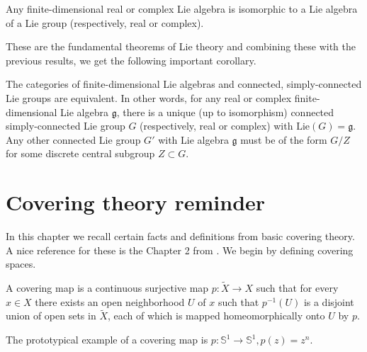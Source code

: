 \documentclass{report}
\begin{document}
\begin{theorem}
Any finite-dimensional real or complex Lie algebra is isomorphic to a Lie algebra of a Lie group (respectively, real or complex).
\end{theorem}

These are the fundamental theorems of Lie theory and combining these with the previous results, we get the following important corollary.

\begin{corollary}
    The categories of finite-dimensional Lie algebras and connected, simply-connected Lie groups are equivalent.
    In other words, for any real or complex finite-dimensional Lie algebra $\mathfrak{g}$, there is a unique (up to isomorphism) connected simply-connected Lie group $G$ (respectively, real or complex) with $\text{Lie}(G) = \mathfrak{g}$. Any other connected Lie group $G'$ with Lie algebra $\mathfrak{g}$ must be of the form $G/Z$ for some discrete central subgroup $Z \subset G$.
\end{corollary}


\appendix

\chapter{Covering theory reminder}
In this chapter we recall certain facts and definitions from basic covering theory.
A nice reference for these is the Chapter 2 from \cite{hatcher2002topology}.
We begin by defining covering spaces.
\begin{definition}
    A covering map is a continuous surjective map $p: \tilde X \to X$ such that for every $x \in X$ there exists an open neighborhood $U$ of $x$ such that $p^{-1}(U)$ is a disjoint union of open sets in $\tilde X$, each of which is mapped homeomorphically onto $U$ by $p$.
\end{definition}
The prototypical example of a covering map is $p: \mathbb S^1 \to \mathbb S^1, p(z) = z^n$.
\end{document}
